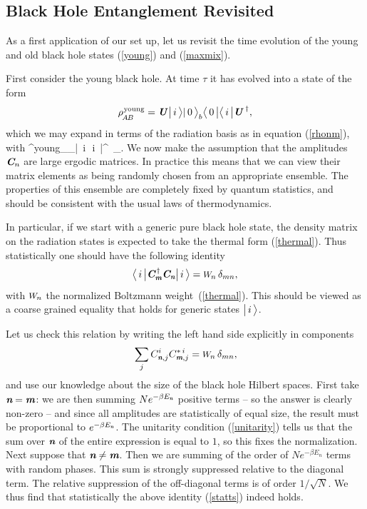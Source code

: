\documentclass[12pt]{article}%
\def\spc{\hspace{.5pt}}
\def\be{\begin{equation}}
\def\ee{\end{equation}}
\begin{document}
\subsection{Black Hole Entanglement Revisited}


As a first application of our set up, let us revisit the time evolution of the young and old black hole states (\ref{young}) and (\ref{maxmix}).

First consider the young black hole. At time $\tau$ it has evolved into a state of the form
\be
\label{newyoung}
\rho^{\spc \rm young}_\abAB = \sS\bigl|\, i\, \ra|\, 0\, \ra_\bB \la \, 0 \, \bigr| \la \, i \,\bigrr|\sS^{\, \dag},  
\ee
which we may expand in terms of the radiation basis as in equation (\ref{rhonm}), with
\bea
\label{nnyoung}
\rho^{\spc \rm young}_\nm \is  \cC_\nom \spc \bigll |\, i\, \ra \la \,i \,\bigrr|\cC^{\, \dag}_\mom. 
\eea
We now make the assumption that the  amplitudes $\mbox{\textit{\textbf{C}\!\,}}_n$ are large ergodic matrices. In practice this means that we can view their matrix elements as being randomly chosen from an appropriate ensemble. The properties of this ensemble are completely fixed by quantum statistics, and should be consistent with the usual laws of thermodynamics.

In particular, if we start with a generic pure black hole state, the density matrix on the radiation states is expected to take the thermal form (\ref{thermal}). Thus statistically one should have the following identity
\be
\label{stats}
\la \,i \,\bigrr| \cC^{\, \dag}_\mom  \cC_\nom \bigll |\, i\, \ra =
\pp_n\, \delta_{mn} ,
\ee
with $\pp_n$ the normalized Boltzmann weight~(\ref{thermal}). 
This should be viewed as a coarse grained equality that holds for generic states $\bigl|\, i\, \bigr\rangle$.  

Let us check this relation by writing the left hand side explicitly in components 
\be
\label{statts}
\,\sum_{j} C_{\nom,j}^\iii C^{* \, \iii}_{\mom,j}= \pp_n\, \delta_{mn}, 
\ee
and use our knowledge about the size of the black hole Hilbert spaces. First take ${ \textit{\textbf n}} = { \textit{\textbf m}}$: we are then summing $Ne^{-\beta E_{ \textit{\textbf n}}}$ positive terms -- so the answer is clearly non-zero -- and since all amplitudes are statistically of equal size, the result must be proportional to $e^{-\beta E_{ \textit{\textbf n}}}$. The unitarity condition (\ref{unitarity}) tells us that the sum over ${ \textit{\textbf n}}$ of the entire expression is equal to $1$, so this fixes the normalization.  Next suppose that ${ \textit{\textbf n}} \neq { \textit{\textbf m}}$. Then we are summing of the order of $N e^{-\beta E_n}$ terms with random phases. This sum is strongly suppressed relative to the diagonal term. The relative suppression of the off-diagonal terms is of order $1/\sqrt{N}$.
We thus find that statistically the above identity (\ref{statts}) indeed holds. 
\end{document}
